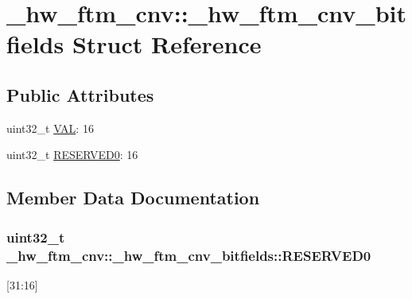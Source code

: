 \hypertarget{struct__hw__ftm__cnv_1_1__hw__ftm__cnv__bitfields}{}\section{\+\_\+hw\+\_\+ftm\+\_\+cnv\+:\+:\+\_\+hw\+\_\+ftm\+\_\+cnv\+\_\+bitfields Struct Reference}
\label{struct__hw__ftm__cnv_1_1__hw__ftm__cnv__bitfields}
\subsection*{Public Attributes}
\begin{DoxyCompactItemize}
\item 
uint32\+\_\+t \hyperlink{struct__hw__ftm__cnv_1_1__hw__ftm__cnv__bitfields_a3c15b14896e9caafbd972394f2c93666}{V\+AL}\+: 16
\item 
uint32\+\_\+t \hyperlink{struct__hw__ftm__cnv_1_1__hw__ftm__cnv__bitfields_a32922c1b034362c8e6c7970e7fa17a65}{R\+E\+S\+E\+R\+V\+E\+D0}\+: 16
\end{DoxyCompactItemize}


\subsection{Member Data Documentation}
\subsubsection[{\texorpdfstring{R\+E\+S\+E\+R\+V\+E\+D0}{RESERVED0}}]{\setlength{\rightskip}{0pt plus 5cm}uint32\+\_\+t \+\_\+hw\+\_\+ftm\+\_\+cnv\+::\+\_\+hw\+\_\+ftm\+\_\+cnv\+\_\+bitfields\+::\+R\+E\+S\+E\+R\+V\+E\+D0}\hypertarget{struct__hw__ftm__cnv_1_1__hw__ftm__cnv__bitfields_a32922c1b034362c8e6c7970e7fa17a65}{}\label{struct__hw__ftm__cnv_1_1__hw__ftm__cnv__bitfields_a32922c1b034362c8e6c7970e7fa17a65}
\mbox{[}31\+:16\mbox{]} 
